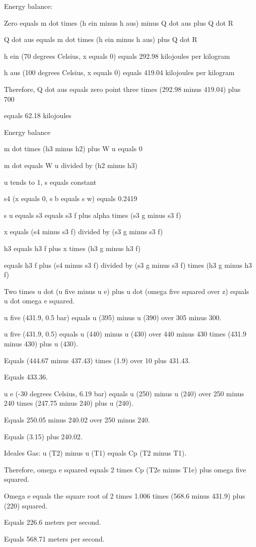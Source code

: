 Energy balance:

Zero equals m dot times (h ein minus h aus) minus Q dot aus plus Q dot R

Q dot aus equals m dot times (h ein minus h aus) plus Q dot R

h ein (70 degrees Celsius, x equals 0) equals 292.98 kilojoules per kilogram

h aus (100 degrees Celsius, x equals 0) equals 419.04 kilojoules per kilogram

Therefore, Q dot aus equals zero point three times (292.98 minus 419.04) plus 700

equals 62.18 kilojoules

Energy balance

m dot times (h3 minus h2) plus W u equals 0

m dot equals W u divided by (h2 minus h3)

u tends to 1, s equals constant

s4 (x equals 0, s b equals s w) equals 0.2419

s u equals s3 equals s3 f plus alpha times (s3 g minus s3 f)

x equals (s4 minus s3 f) divided by (s3 g minus s3 f)

h3 equals h3 f plus x times (h3 g minus h3 f)

equals h3 f plus (s4 minus s3 f) divided by (s3 g minus s3 f) times (h3 g minus h3 f)

Two times u dot (u five minus u e) plus u dot (omega five squared over z) equals u dot omega e squared.

u five (431.9, 0.5 bar) equals u (395) minus u (390) over 305 minus 300.

u five (431.9, 0.5) equals u (440) minus u (430) over 440 minus 430 times (431.9 minus 430) plus u (430).

Equals (444.67 minus 437.43) times (1.9) over 10 plus 431.43.

Equals 433.36.

u e (-30 degrees Celsius, 6.19 bar) equals u (250) minus u (240) over 250 minus 240 times (247.75 minus 240) plus u (240).

Equals 250.05 minus 240.02 over 250 minus 240.

Equals (3.15) plus 240.02.

Ideales Gas: u (T2) minus u (T1) equals Cp (T2 minus T1).

Therefore, omega e squared equals 2 times Cp (T2e minus T1e) plus omega five squared.

Omega e equals the square root of 2 times 1.006 times (568.6 minus 431.9) plus (220) squared.

Equals 226.6 meters per second.

Equals 568.71 meters per second.